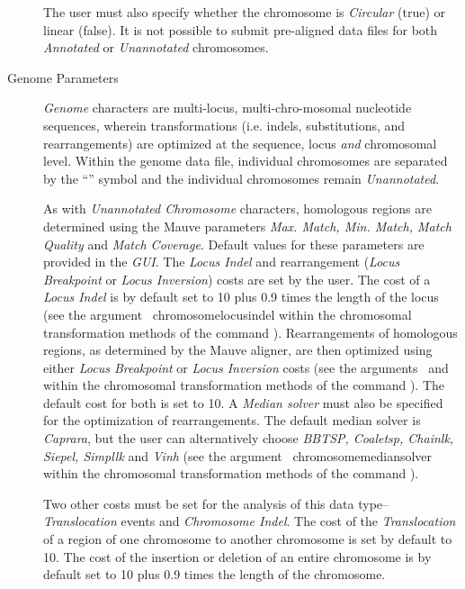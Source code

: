 \begin{description}
		\indent The user must also specify whether the chromosome is \emph{Circular} (true) or linear (false).
		It is not possible to submit pre-aligned data files for both \emph{Annotated} or \emph{Unannotated} 
		chromosomes. 
		
		
	\item [Genome Parameters] \emph{Genome} characters are multi-locus, multi-chro-mosomal nucleotide 
		sequences, wherein transformations (i.e. indels, substitutions, and rearrangements) are optimized 
		at the sequence, locus \emph{and} chromosomal level.  Within the genome data file, individual 
		chromosomes are separated by the  ``\atsymbol'' symbol and the individual chromosomes remain 
		\emph{Unannotated}. 
		
		\indent As with \emph{Unannotated Chromosome} characters, homologous regions are determined 
		using the Mauve parameters \emph{Max. Match, Min. Match, Match Quality} and 
		\emph {Match Coverage}. Default values for these parameters are provided in the \emph{GUI}.
		The \emph{Locus Indel} and rearrangement (\emph{Locus Breakpoint} or \emph{Locus Inversion}) 
		costs are set by the user. The cost of a \emph{Locus Indel} is by default set to 10 plus 0.9 times 
		the length of the locus (see the argument~ {chromosomelocusindel}  
		within the 	chromosomal transformation methods of the command ). 
		Rearrangements of homologous regions, as determined  by the Mauve aligner, are then 
		optimized using either \emph{Locus Breakpoint} or \emph{Locus Inversion} costs 
		(see the arguments~ 
		and~ within the chromosomal 
		transformation methods of the command ). 
		The default cost for both is set to 10. A \emph{Median solver} must also be specified for the 
		optimization of rearrangements. The default median solver is \emph{Caprara}, 
		but the user can alternatively choose \emph{BBTSP, Coaletsp, 
		Chainlk, Siepel, Simpllk} and \emph{Vinh} (see the argument~
		{chromosomemediansolver} within the chromosomal transformation methods of the command 
		).
		
		\indent Two other costs must be set for the analysis of this data type--\emph{Translocation} 
		events and \emph{Chromosome Indel}. The cost of the \emph{Translocation} of a region of one 
		chromosome to another chromosome is set by default to 10.  The cost of the insertion or deletion
		of an entire chromosome is by default set to 10 plus 0.9 times the length of the chromosome.
				

\end{description}
